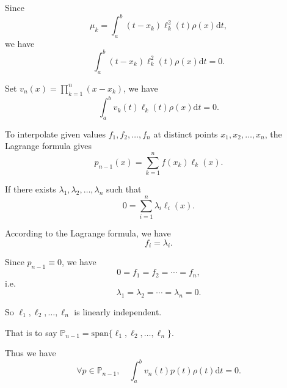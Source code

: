 \documentclass[a4paper]{article}
\begin{document}
Since 
$$
\mu_k=\int_{a}^{b}(t-x_k)\ell_k^2(t)\rho(x)\mathrm{d}t,
$$
we have
$$
\int_{a}^{b}(t-x_k)\ell_k^2(t)\rho(x)\mathrm{d}t=0.
$$

Set $v_n(x)=\prod_{k=1}^n(x-x_k)$, we have
$$
\int_{a}^{b}v_k(t)\ell_k(t)\rho(x)\mathrm{d}t=0.
$$

To interpolate given values $f_1,f_2,\ldots,f_n$ at distinct points $x_1,x_2,\ldots,x_n$, the Lagrange formula gives 
$$
p_{n-1}(x)=\sum_{k=1}^n f(x_k)\ell_k(x).
$$

If there exists $\lambda_1,\lambda_2,\ldots,\lambda_n$ such that 
$$
0=\sum_{i=1}^{n}\lambda_i \ell_i(x).
$$

According to the Lagrange formula, we have
$$
f_i=\lambda_i.
$$

Since $p_{n-1}\equiv0$, we have
$$
0=f_1=f_2=\cdots=f_n,
$$
i.e. 
$$
\lambda_1=\lambda_2=\cdots=\lambda_n=0.
$$

So $\ell_1,\ell_2,\ldots,\ell_n$ is linearly independent.

That is to say $\mathbb{P}_{n-1}=\text{span}\{\ell_1,\ell_2,\ldots,\ell_n\}$.

Thus we have
$$
\forall p\in\mathbb{P}_{n-1},\quad\int_{a}^{b}v_n(t) p(t)\rho(t)\mathrm{d}t=0.
$$
\end{document}
